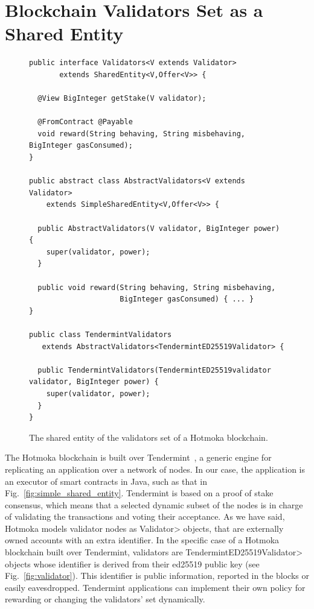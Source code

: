 \section{Blockchain Validators Set as a Shared Entity}\label{sec:validators}





\begin{figure}[t]
  \begin{center}
    \begin{lstlisting}[language=Takamaka]
public interface Validators<V extends Validator>
       extends SharedEntity<V,Offer<V>> {

  @View BigInteger getStake(V validator);

  @FromContract @Payable
  void reward(String behaving, String misbehaving, BigInteger gasConsumed);
}

public abstract class AbstractValidators<V extends Validator>
    extends SimpleSharedEntity<V,Offer<V>> {

  public AbstractValidators(V validator, BigInteger power) {
    super(validator, power);
  }

  public void reward(String behaving, String misbehaving,
                     BigInteger gasConsumed) { ... }
}

public class TendermintValidators
   extends AbstractValidators<TendermintED25519Validator> {

  public TendermintValidators(TendermintED25519validator validator, BigInteger power) {
    super(validator, power);
  }
}
    \end{lstlisting}
  \end{center}
  \caption{The shared entity of the validators set of a Hotmoka blockchain.}\label{fig:validators}
\end{figure}

The Hotmoka blockchain is built over Tendermint~\cite{Kwon14}, a
generic engine for replicating an application over a network of nodes. In our case,
the application is an executor of smart contracts in Java, such as that in
Fig.~\ref{fig:simple_shared_entity}. Tendermint is based on a proof of stake
consensus, which means that a selected dynamic subset of the nodes is in charge of
validating the transactions and voting their acceptance. 
As we have said,
Hotmoka models validator nodes as \<Validator> objects, that are externally owned accounts
with an extra identifier. In the specific case of a Hotmoka blockchain built over Tendermint,
validators are \<TendermintED25519Validator> objects whose
identifier is derived from their ed25519 public key (see Fig.~\ref{fig:validator}).
This identifier is public information, reported in the blocks or easily eavesdropped.
Tendermint applications can implement their own
policy for rewarding or changing the validators' set dynamically.

